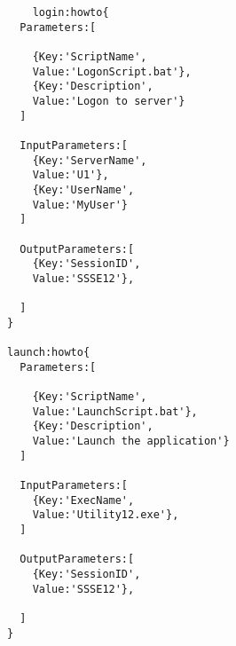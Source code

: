 \begin{lstlisting}
	login:howto{
  Parameters:[

    {Key:'ScriptName',
    Value:'LogonScript.bat'},
    {Key:'Description',
    Value:'Logon to server'}
  ]

  InputParameters:[
    {Key:'ServerName',
    Value:'U1'},
    {Key:'UserName',
    Value:'MyUser'}
  ]

  OutputParameters:[
    {Key:'SessionID',
    Value:'SSSE12'},

  ]
}

launch:howto{
  Parameters:[

    {Key:'ScriptName',
    Value:'LaunchScript.bat'},
    {Key:'Description',
    Value:'Launch the application'}
  ]

  InputParameters:[
    {Key:'ExecName',
    Value:'Utility12.exe'},
  ]

  OutputParameters:[
    {Key:'SessionID',
    Value:'SSSE12'},

  ]
}
\end{lstlisting}
\clearpage
